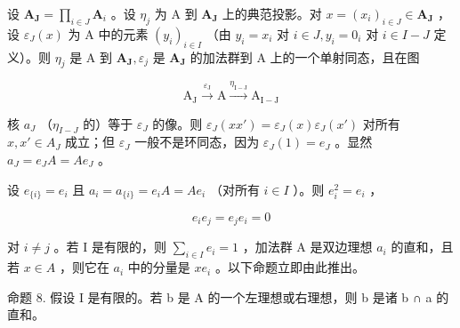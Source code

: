 设 \(\mathbf{A}_{\mathbf{J}} = \prod_{i\in J}\mathbf{A}_i\) 。设 \(\eta_{j}\) 为 A 到 \(\mathbf{A}_{\mathbf{J}}\) 上的典范投影。对 \(x = (x_{i})_{i\in J}\in \mathbf{A}_{\mathbf{J}}\) ，设 \(\varepsilon_{J}(x)\) 为 A 中的元素 \((y_{i})_{i\in I}\) （由 \(y_{i} = x_{i}\) 对 \(i\in J, y_{i} = 0_{i}\) 对 \(i\in I - J\) 定义）。则 \(\eta_{j}\) 是 A 到 \(\mathbf{A}_{\mathbf{J}},\varepsilon_{j}\) 是 \(\mathbf{A}_{\mathbf{J}}\) 的加法群到 A 上的一个单射同态，且在图

\[
\mathrm{A} _ {\mathrm{J}} \xrightarrow {\varepsilon_ {\mathrm{J}}} \mathrm{A} \xrightarrow {\eta_ {\mathrm{I} - \mathrm{J}}} \mathrm{A} _ {\mathrm{I} - \mathrm{J}}
\]

核 \(a_{J}\) （\(\eta_{I-J}\) 的）等于 \(\varepsilon_{J}\) 的像。则 \(\varepsilon_{J}(xx') = \varepsilon_{J}(x)\varepsilon_{J}(x')\) 对所有 \(x, x' \in A_{J}\) 成立；但 \(\varepsilon_{J}\) 一般不是环同态，因为 \(\varepsilon_{J}(1) = e_{J}\) 。显然 \(a_{J} = e_{J}A = Ae_{J}\) 。

设 \(e_{\{i\}} = e_i\) 且 \(a_i = a_{\{i\}} = e_i A = Ae_i\) （对所有 \(i \in I\) ）。则 \(e_i^2 = e_i\) ，

\[
e _ {i} e _ {j} = e _ {j} e _ {i} = 0
\]

对 \(i \neq j\) 。若 I 是有限的，则 \(\sum_{i \in I} e_i = 1\) ，加法群 A 是双边理想 \(a_i\) 的直和，且若 \(x \in A\) ，则它在 \(a_i\) 中的分量是 \(xe_i\) 。以下命题立即由此推出。

命题 8. 假设 I 是有限的。若 b 是 A 的一个左理想或右理想，则 b 是诸 b ∩ a 的直和。

